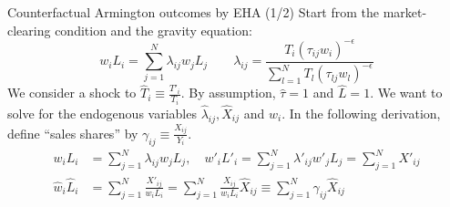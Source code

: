 \documentclass[10pt,notes=hide]{beamer}
\begin{document}
\begin{frame}{Counterfactual Armington outcomes by EHA (1/2)}
Start from the market-clearing condition and the gravity equation:
\begin{equation*}
w_i L_i
=
\sum_{j=1}^{N} \lambda_{ij} w_j L_j 
\quad \quad
\lambda_{ij} 
=
\frac{T_{i} \left(\tau_{ij}w_i\right)^{-\epsilon}}{\sum_{l=1}^{N} T_{l}  \left(\tau_{lj}w_l\right)^{-\epsilon}}
\end{equation*}
We consider a shock to $\hat{T}_{i} \equiv \frac{T'_{i}}{T_{i}}$.
By assumption, $\hat{\tau}=1$ and $\hat{L}=1$.
We want to solve for the endogenous variables $\hat{\lambda}_{ij}, \hat{X}_{ij}$ and $\hat{w}_{i}$.
In the following derivation, 
define ``sales shares'' by
$\gamma_{ij}\equiv\frac{X_{ij}}{Y_{i}}$.
\begin{align}
w_i L_i
&=
\sum_{j=1}^{N} \lambda_{ij} w_j L_j,
\quad
w'_i L'_i
=
\sum_{j=1}^{N} \lambda'_{ij} w'_j L_j
=
\sum_{j=1}^{N} X'_{ij}
\nonumber \\
\hat{w}_i \hat{L}_i
&= 
\sum_{j=1}^{N} \frac{X'_{ij}}{w_i L_i}
=
\sum_{j=1}^{N} \frac{X_{ij}}{w_i L_i} \hat{X}_{ij}
\equiv
\sum_{j=1}^{N} \gamma_{ij} \hat{X}_{ij}  \label{eqn:20180428:1sector:hatincome}
\end{align}
\end{frame}
\end{document}
